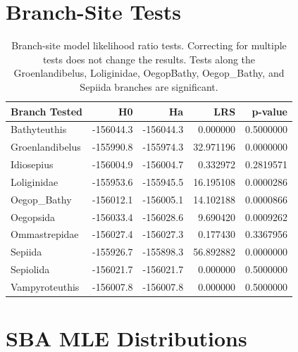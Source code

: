 \documentclass[12pt,letterpaper]{article}\usepackage[]{graphicx}\usepackage[]{color}
\newenvironment{knitrout}{}{} %
\begin{document}
\section*{Branch-Site Tests}
\begin{knitrout}
\color{fgcolor}\begin{table}[!h]

\caption{\label{tab:lr}Branch-site model likelihood ratio tests.  Correcting for
multiple tests does not change the results.  Tests along the Groenlandibelus,
Loliginidae, OegopBathy, Oegop\_Bathy, and Sepiida branches are significant.}
\centering
\begin{tabular}{lrrrr}
\toprule
Branch Tested & H0 & Ha & LRS & p-value\\
\midrule
Bathyteuthis & -156044.3 & -156044.3 & 0.000000 & 0.5000000\\
Groenlandibelus & -155990.8 & -155974.3 & 32.971196 & 0.0000000\\
Idiosepius & -156004.9 & -156004.7 & 0.332972 & 0.2819571\\
Loliginidae & -155953.6 & -155945.5 & 16.195108 & 0.0000286\\
Oegop\_Bathy & -156012.1 & -156005.1 & 14.102188 & 0.0000866\\
\addlinespace
Oegopsida & -156033.4 & -156028.6 & 9.690420 & 0.0009262\\
Ommastrepidae & -156027.4 & -156027.3 & 0.177430 & 0.3367956\\
Sepiida & -155926.7 & -155898.3 & 56.892882 & 0.0000000\\
Sepiolida & -156021.7 & -156021.7 & 0.000000 & 0.5000000\\
Vampyroteuthis & -156007.8 & -156007.8 & 0.000000 & 0.5000000\\
\bottomrule
\end{tabular}
\end{table}


\end{knitrout}

\clearpage

\section*{SBA MLE Distributions}

\end{document}
